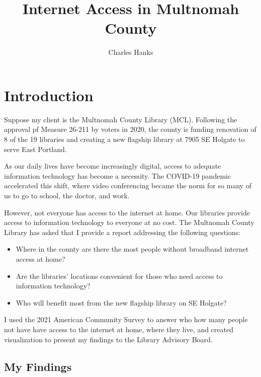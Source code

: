 \documentclass[
]{article}
\title{Internet Access in Multnomah County}
\author{Charles Hanks}
\date{}
\providecommand{\tightlist}{%
  \setlength{\itemsep}{0pt}\setlength{\parskip}{0pt}}
\begin{document}
\maketitle

\hypertarget{introduction}{%
\section{Introduction}\label{introduction}}

Suppose my client is the Multnomah County Library (MCL). Following the
approval pf Measure 26-211 by voters in 2020, the county is funding
renovation of 8 of the 19 libraries and creating a new flagship library
at 7905 SE Holgate to serve East Portland.

As our daily lives have become increasingly digital, access to adequate
information technology has become a necessity. The COVID-19 pandemic
accelerated this shift, where video conferencing became the norm for so
many of us to go to school, the doctor, and work.

However, not everyone has access to the internet at home. Our libraries
provide access to information technology to everyone at no cost. The
Multnomah County Library has asked that I provide a report addressing
the following questions:

\begin{itemize}
\tightlist
\item
  Where in the county are there the most people without broadband
  internet access at home?
\item
  Are the libraries' locations convenient for those who need access to
  information technology?\\
\item
  Who will benefit most from the new flagship library on SE Holgate?
\end{itemize}

I used the 2021 American Community Survey to answer who how many people
not have have access to the internet at home, where they live, and
created visualization to present my findings to the Library Advisory
Board.

\hypertarget{my-findings}{%
\subsection{My Findings}\label{my-findings}}
\end{document}
